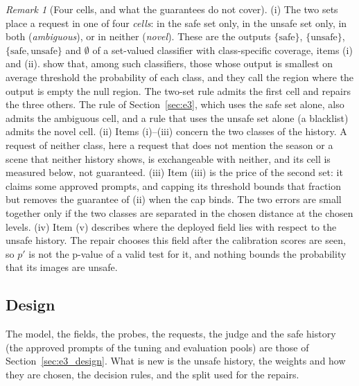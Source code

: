 \documentclass{article}
\theoremstyle{plain}
\theoremstyle{remark}
\newtheorem{remark}[theorem]{Remark}
\begin{document}
\begin{remark}[Four cells, and what the guarantees do not cover]\label{rem:two_sets}
(i) The two sets place a request in one of four \emph{cells}: in the safe set only, in the unsafe set only, in both (\emph{ambiguous}),
or in neither (\emph{novel}). These are the outputs $\{\text{safe}\}$, $\{\text{unsafe}\}$, $\{\text{safe},\text{unsafe}\}$ and $\emptyset$
of a set-valued classifier with class-specific coverage, items (i) and (ii). \citet[Section~2.2]{sadinle2019least} show that, among such
classifiers, those whose output is smallest on average threshold the probability of each class, and they call the region where the
output is empty the null region. The two-set rule admits the first cell and repairs the three others. The rule of
Section~\ref{sec:e3}, which uses the safe set alone, also admits the ambiguous cell, and a rule that uses the unsafe set alone (a
blacklist) admits the novel cell.
(ii) Items (i)--(iii) concern the two classes of the history. A request of neither class, here a request that does not mention the
season or a scene that neither history shows, is exchangeable with neither, and its cell is measured below, not guaranteed.
(iii) Item (iii) is the price of the second set: it claims some approved prompts, and capping its threshold bounds that fraction but
removes the guarantee of (ii) when the cap binds. The two errors are small together only if the two classes are separated in the chosen
distance at the chosen levels.
(iv) Item (v) describes where the deployed field lies with respect to the unsafe history. The repair chooses this field after the
calibration scores are seen, so $p'$ is not the p-value of a valid test for it, and nothing bounds the probability that its images are
unsafe.
\end{remark}

\subsection{Design}\label{sec:e3u_design}

The model, the fields, the probes, the requests, the judge and the safe history (the approved prompts of the tuning and evaluation pools)
are those of Section~\ref{sec:e3_design}. What is new is the unsafe history, the weights and how they are chosen, the decision rules,
and the split used for the repairs.
\end{document}
